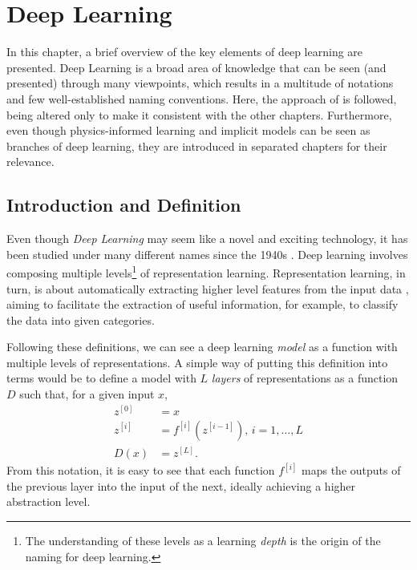 \chapter{Deep Learning}\label{ch:deep-learning}

In this chapter, a brief overview of the key elements of deep learning are presented.
Deep Learning is a broad area of knowledge that can be seen (and presented) through many viewpoints, which results in a multitude of notations and few well-established naming conventions.
Here, the approach of \textcite{goodfellow_deep_2016} is followed, being altered only to make it consistent with the other chapters.
Furthermore, even though physics-informed learning and implicit models can be seen as branches of deep learning, they are introduced in separated chapters for their relevance.

\section{Introduction and Definition}

Even though \textit{Deep Learning} may seem like a novel and exciting technology, it has been studied under many different names since the 1940s \cite{goodfellow_deep_2016}.
Deep learning involves composing multiple levels\footnote{The understanding of these levels as a learning \textit{depth} is the origin of the naming for deep learning.} of representation learning.
Representation learning, in turn, is about automatically extracting higher level features from the input data \cite{lecun_deep_2015,bengio_representation_2013}, aiming to facilitate the extraction of useful information, for example, to classify the data into given categories.

Following these definitions, we can see a deep learning \textit{model} as a function with multiple levels of representations.
A simple way of putting this definition into terms would be to define a model with $L$ \emph{layers} of representations as a function $D$ such that, for a given input $x$,
\begin{equation}\label{eq:dl-model}
\begin{split}
    z^{[0]} &= x \\
    z^{[i]} &= f^{[i]}(z^{[i-1]}),\,i=1,\ldots,L \\
    D(x) &= z^{[L]}.
\end{split}
\end{equation}
From this notation, it is easy to see that each function $f^{[i]}$ maps the outputs of the previous layer into the input of the next, ideally achieving a higher abstraction level.


